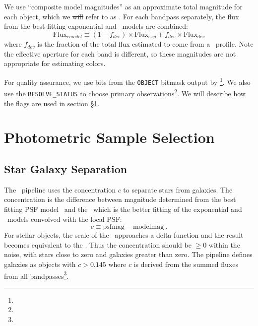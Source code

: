 \documentclass[preprint]{aastex}
\begin{document}
We use ``composite model magnitudes'' as an approximate total magnitude for
each object, which we \sout{will} refer to as \cmodelmag.  For each bandpass
separately, the flux from the best-fitting exponential and \devauc\ models are
combined:
\begin{equation}
\textrm{Flux}_{cmodel} \equiv (1-f_{dev})\times \textrm{Flux}_{exp} + f_{dev} \times \textrm{Flux}_{dev}
\end{equation}
where $f_{dev}$ is the fraction of the total flux estimated to come from a
\devauc\ profile.  Note the effective aperture for each band is
different, so these magnitudes are not appropriate for estimating colors.

For quality assurance, we use bits from the \texttt{OBJECT} bitmask output by
\photo \footnote{\DRateflags}.    We also use the \texttt{RESOLVE\_STATUS} to
choose primary observations\footnote{\DRateresolve}.  We will describe how the
flags are used in section \S \ref{sec:select}.

    

\section{Photometric Sample Selection} \label{sec:select}

\subsection{Star Galaxy Separation} \label{sec:sg}

The \photo\ pipeline uses the concentration $c$ to separate stars from
galaxies.  The concentration is the difference between magnitude determined
from the best fitting PSF model \psfmag\ and the \modelmag\, which is
the better fitting of the exponential and \devauc\ models convolved
with the local PSF:
\begin{equation}
c \equiv \textrm{psfmag} - \textrm{modelmag}~.
\end{equation}
For stellar objects, the scale of the \modelmag\ approaches a delta function and
the result becomes equivalent to the \psfmag.  Thus the concentration should be
$\ge 0$ within the noise, with stars close to zero and galaxies greater than
zero.  The pipeline defines galaxies as objects with $c > 0.145$ where $c$ is
derived from the summed fluxes from all bandpasses\footnote{\DRateclass}.  
\end{document}
